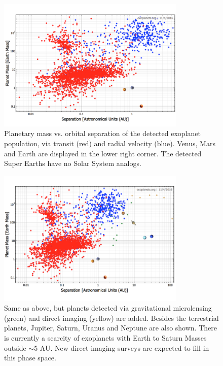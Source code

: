 \documentclass[12pt, letterpaper]{article}
\begin{document}
\begin{figure}[h!]
\centering
\includegraphics[width=0.8\textwidth]{exo_solar}
\caption{Planetary mass vs. orbital separation of the detected exoplanet population, via transit (red) and radial velocity (blue). Venus, Mars and Earth are displayed in the lower right corner. The detected Super Earths have no Solar System analogs.}
\label{fig:chemical}
\end{figure}

\begin{figure}[h!]
\centering
\includegraphics[width=0.8\textwidth]{exo_solar_all}
\caption{Same as above, but planets detected via gravitational microlensing (green) and direct imaging (yellow) are added. Besides the terrestrial planets, Jupiter, Saturn, Uranus and Neptune are also shown. There is currently a scarcity of exoplanets with Earth to Saturn Masses outside $\sim$5 AU. New direct imaging surveys are expected to fill in this phase space.}
\label{fig:chemical}
\end{figure}
\end{document}
